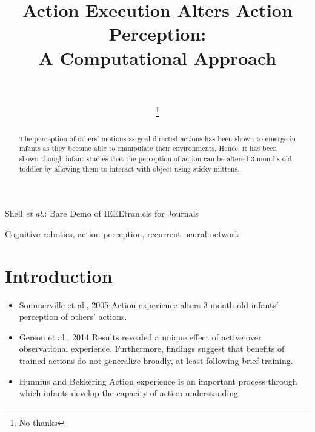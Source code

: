 \documentclass[journal]{IEEEtran}
\begin{document}
\title{Action Execution Alters Action Perception:\\ A Computational Approach}

\author{\\

\thanks{No thanks}}

%
{Shell \MakeLowercase{\textit{et al.}}: Bare Demo of IEEEtran.cls for Journals}

\maketitle

\begin{abstract}
The perception of others' motions as goal directed actions has been shown to emerge in infants as they become able to manipulate their environments. Hence, it has been shown though infant studies that the perception of action can be altered 3-months-old toddler by allowing them to interact with object using sticky mittens.  

\end{abstract}

\begin{IEEEkeywords}
Cognitive robotics, action perception, recurrent neural network
\end{IEEEkeywords}


\section{Introduction}

\begin{itemize}
\item Sommerville et al., 2005 \cite{Sommerville2005} Action experience alters 3-month-old infants' perception of others' actions.
\item Gerson et al., 2014 \cite{gerson2014learning} Results revealed a unique effect of active over observational experience. Furthermore, findings suggest that benefits of trained actions do not generalize broadly, at least following brief training.
\item Hunnius and Bekkering \cite{hunnius2014you} Action experience is an important process through which infants develop the capacity of action understanding
\end{itemize}
\end{document}
